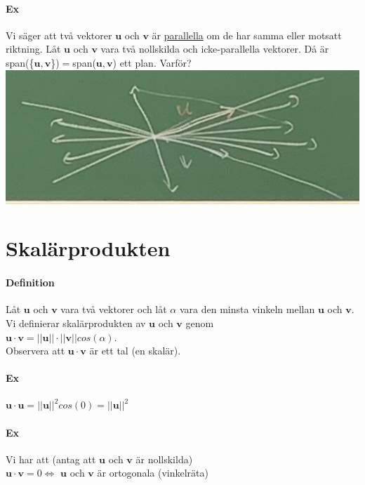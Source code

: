     \paragraph{Ex} Vi säger att två vektorer $\bm{u}$ och $\bm{v}$ är \underline{parallella} om de har samma eller motsatt riktning. 
    Låt $\bm{u}$ och $\bm{v}$ vara två nollskilda och icke-parallella vektorer. Då är span(\{$\bm{u,v}$\})$=$span($\bm{u},\bm{v}$) ett plan. Varför?\\
    \includegraphics[scale=0.15]{imgs/22-01-20-img02.jpg}
    
\section{Skalärprodukten}
    \paragraph{Definition} Låt $\bm{u}$ och $\bm{v}$ vara två vektorer och låt $\alpha$ vara den minsta vinkeln mellan $\bm{u}$ och $\bm{v}$.
    Vi definierar skalärprodukten av $\bm{u}$ och $\bm{v}$ genom \\
    $\bm{u}\cdot \bm{v}=||\bm{u}||\cdot ||\bm{v}||cos(\alpha)$. 
    \\Observera att $\bm{u}\cdot \bm{v}$ är ett tal (en skalär).
    
    \paragraph{Ex} $\bm{u}\cdot \bm{u}=||\bm{u}||^{2}cos(0)=||\bm{u}||^{2}$
    
    \paragraph{Ex} Vi har att (antag att $\bm{u}$ och $\bm{v}$ är nollskilda)\\
    $\bm{u}\cdot \bm{v} = 0 \Leftrightarrow $ $\bm{u}$ och $\bm{v}$ är ortogonala (vinkelräta)
    
